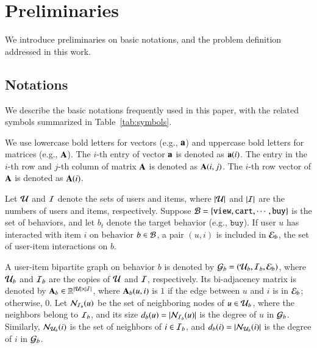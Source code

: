 \section{Preliminaries}
\label{sec:preliminaires}

We introduce preliminaries on basic notations, and the problem definition addressed in this work. 

\subsection{Notations}
We describe the basic notations frequently used in this paper, with the related symbols summarized in Table~\ref{tab:symbols}.

We use lowercase bold letters for vectors (e.g., $\mathbf{a}$) and uppercase bold letters for matrices (e.g., $\mathbf{A}$).
The $i$-th entry of vector $\mathbf{a}$ is denoted as $\mathbf{a}(i)$.
The entry in the $i$-th row and $j$-th column of matrix $\mathbf{A}$ is denoted as $\mathbf{A}(i, j)$.
The $i$-th row vector of $\mathbf{A}$ is denoted as $\mathbf{A}(i)$.

Let $\mathcal{U}$ and $\mathcal{I}$ denote the sets of users and items, where $|\mathcal{U}|$ and $|\mathcal{I}|$ are the numbers of users and items, respectively.
Suppose $\mathcal{B} = \{\texttt{view}, \texttt{cart}, \cdots, \texttt{buy}\}$ is the set of behaviors, and let $b_{t}$ denote the target behavior (e.g., $\texttt{buy}$).
If user $u$ has interacted with item $i$ on behavior $b \in \mathcal{B}$, a pair $(u, i)$ is included in $\mathcal{E}_{b}$, the set of user-item interactions on $b$.

A user-item bipartite graph on behavior $b$ is denoted by $\mathcal{G}_{b} = (\mathcal{U}_{b}, \mathcal{I}_{b}, \mathcal{E}_{b})$, where $\mathcal{U}_{b}$ and $\mathcal{I}_{b}$ are the copies of $\mathcal{U}$ and $\mathcal{I}$, respectively.
Its bi-adjacency matrix is denoted by $\mathbf{A}_{b} \in \mathbb{R}^{|\mathcal{U}| \times |\mathcal{I}|}$, where $\mathbf{A}_{b}(u, i)$ is $1$ if the edge between $u$ and $i$ is in $\mathcal{E}_{b}$; otherwise, $0$.
Let $\mathcal{N}_{\mathcal{I}_{b}}(u)$ be the set of neighboring nodes of $u \in \mathcal{U}_{b}$, where the neighbors belong to $\mathcal{I}_{b}$, and its size $d_b(u) = |\mathcal{N}_{\mathcal{I}_{b}}(u)|$ is the degree of $u$ in $\mathcal{G}_{b}$. 
%
Similarly, $\mathcal{N}_{\mathcal{U}_{b}}(i)$ is the set of neighbors of $i \in \mathcal{I}_{b}$, and $d_b(i) = |\mathcal{N}_{\mathcal{U}_{b}}(i)|$ is the degree of $i$ in $\mathcal{G}_{b}$.

